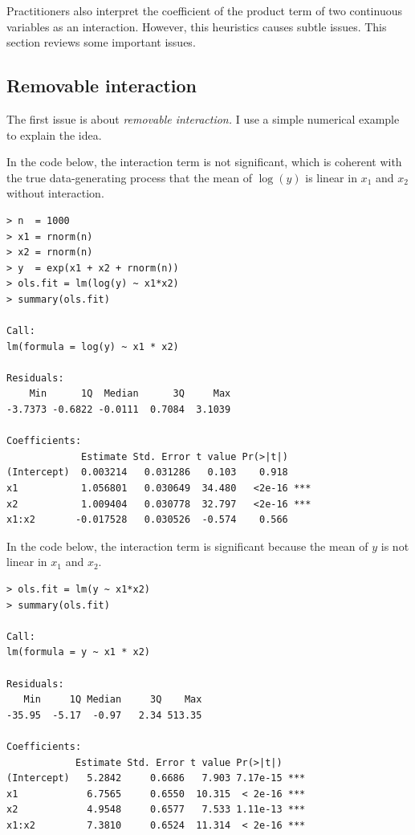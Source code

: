 Practitioners also interpret the coefficient of the product term of two continuous variables as an interaction. However, this heuristics causes subtle issues. This section reviews some important issues. 


\subsection{Removable interaction}

The first issue is about {\it removable interaction.} I use a simple numerical example to explain the idea. 

In the  code below, the interaction term is not significant, which is coherent with the true data-generating process that the mean of $\log (y)$ is linear in $x_1$ and $x_2$ without interaction.



\begin{lstlisting}
> n  = 1000
> x1 = rnorm(n)
> x2 = rnorm(n)
> y  = exp(x1 + x2 + rnorm(n))
> ols.fit = lm(log(y) ~ x1*x2)
> summary(ols.fit)

Call:
lm(formula = log(y) ~ x1 * x2)

Residuals:
    Min      1Q  Median      3Q     Max 
-3.7373 -0.6822 -0.0111  0.7084  3.1039 

Coefficients:
             Estimate Std. Error t value Pr(>|t|)    
(Intercept)  0.003214   0.031286   0.103    0.918    
x1           1.056801   0.030649  34.480   <2e-16 ***
x2           1.009404   0.030778  32.797   <2e-16 ***
x1:x2       -0.017528   0.030526  -0.574    0.566    
\end{lstlisting}


In the  code below, the interaction term is significant because the mean of $y$ is not linear in $x_1$ and $x_2$. 

\begin{lstlisting}
> ols.fit = lm(y ~ x1*x2)
> summary(ols.fit)

Call:
lm(formula = y ~ x1 * x2)

Residuals:
   Min     1Q Median     3Q    Max 
-35.95  -5.17  -0.97   2.34 513.35 

Coefficients:
            Estimate Std. Error t value Pr(>|t|)    
(Intercept)   5.2842     0.6686   7.903 7.17e-15 ***
x1            6.7565     0.6550  10.315  < 2e-16 ***
x2            4.9548     0.6577   7.533 1.11e-13 ***
x1:x2         7.3810     0.6524  11.314  < 2e-16 ***
\end{lstlisting}


